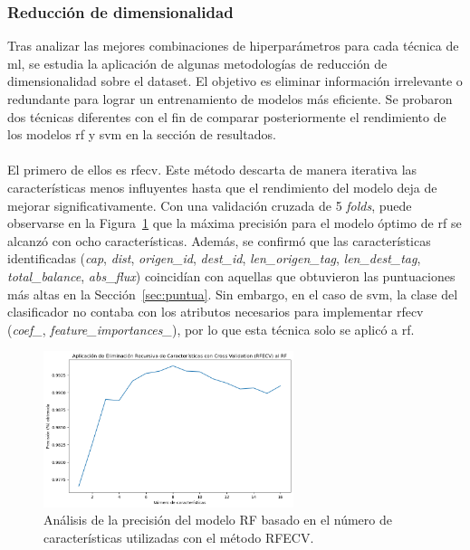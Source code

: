 \subsubsection{Reducción de dimensionalidad}

Tras analizar las mejores combinaciones de hiperparámetros para cada técnica de \gls{ml}, se estudia la aplicación de algunas metodologías de reducción de dimensionalidad sobre el dataset. El objetivo es eliminar información irrelevante o redundante para lograr un entrenamiento de modelos más eficiente. Se probaron dos técnicas diferentes con el fin de comparar posteriormente el rendimiento de los modelos \gls{rf} y \gls{svm} en la sección de resultados. \\
\\
El primero de ellos es \gls{rfecv}. Este método descarta de manera iterativa las características menos influyentes hasta que el rendimiento del modelo deja de mejorar significativamente. Con una validación cruzada de 5 \textit{folds}, puede observarse en la Figura~\ref{fig:fault_sg_12} que la máxima precisión para el modelo óptimo de \gls{rf} se alcanzó con ocho características. Además, se confirmó que las características identificadas (\textit{cap}, \textit{dist}, \textit{origen\_id}, \textit{dest\_id}, \textit{len\_origen\_tag}, \textit{len\_dest\_tag}, \textit{total\_balance}, \textit{abs\_flux}) coincidían con aquellas que obtuvieron las puntuaciones más altas en la Sección~\ref{sec:puntua}. Sin embargo, en el caso de \gls{svm}, la clase del clasificador no contaba con los atributos necesarios para implementar \gls{rfecv} (\textit{coef\_}, \textit{feature\_importances\_}), por lo que esta técnica solo se aplicó a \gls{rf}.  
    
\begin{figure}[H]
\centering
\includegraphics[width=0.65\textwidth]{fig/06_fault_sg/fault_sg_12.png}
\caption{Análisis de la precisión del modelo RF basado en el número de características utilizadas con el método RFECV.}
\label{fig:fault_sg_12}
\end{figure}
    
